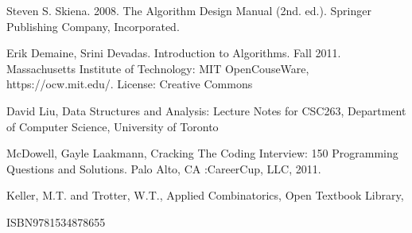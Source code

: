 \documentclass{article}
\begin{document}


\newpage
\begin{thebibliography}{}
Steven S. Skiena. 2008. The Algorithm Design Manual (2nd. ed.). Springer Publishing Company, Incorporated.

Erik Demaine, Srini Devadas. Introduction to Algorithms. Fall 2011. Massachusetts Institute of Technology: MIT OpenCouseWare, https://ocw.mit.edu/. License: Creative Commons

David Liu, Data Structures and Analysis: Lecture Notes for CSC263, Department of Computer Science, University of Toronto

McDowell, Gayle Laakmann, Cracking The Coding Interview: 150 Programming Questions and Solutions. Palo Alto, CA :CareerCup, LLC, 2011.

Keller, M.T. and Trotter, W.T., Applied Combinatorics, Open Textbook Library,

ISBN9781534878655
\end{thebibliography}
\end{document}
